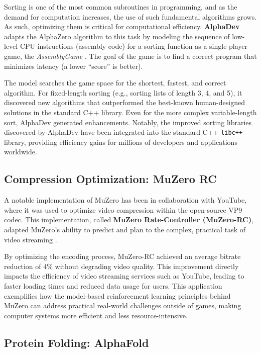 Sorting is one of the most common subroutines in programming, and as the demand for computation increases, the use of such fundamental algorithms grows. As such, optimizing them is critical for computational efficiency. \textbf{AlphaDev} adapts the AlphaZero algorithm to this task by modeling the sequence of low-level CPU instructions (assembly code) for a sorting function as a single-player game, the \textit{AssemblyGame} \cite{alphadev2023}. The goal of the game is to find a correct program that minimizes latency (a lower ``score'' is better).

The model searches the game space for the shortest, fastest, and correct algorithm. For fixed-length sorting (e.g., sorting lists of length 3, 4, and 5), it discovered new algorithms that outperformed the best-known human-designed solutions in the standard C++ library. Even for the more complex variable-length sort, AlphaDev generated enhancements. Notably, the improved sorting libraries discovered by AlphaDev have been integrated into the standard C++ \texttt{libc++} library, providing efficiency gains for millions of developers and applications worldwide.

\subsection{Compression Optimization: MuZero RC}
\label{subsec:muzerorc}

A notable implementation of MuZero has been in collaboration with YouTube, where it was used to optimize video compression within the open-source VP9 codec. This implementation, called \textbf{MuZero Rate-Controller (MuZero-RC)}, adapted MuZero's ability to predict and plan to the complex, practical task of video streaming \cite{muzero_real_world_2022}.

By optimizing the encoding process, MuZero-RC achieved an average bitrate reduction of 4\% without degrading video quality. This improvement directly impacts the efficiency of video streaming services such as YouTube, leading to faster loading times and reduced data usage for users. This application exemplifies how the model-based reinforcement learning principles behind MuZero can address practical real-world challenges outside of games, making computer systems more efficient and less resource-intensive.

\subsection{Protein Folding: AlphaFold}
\label{subsec:alphafold}

